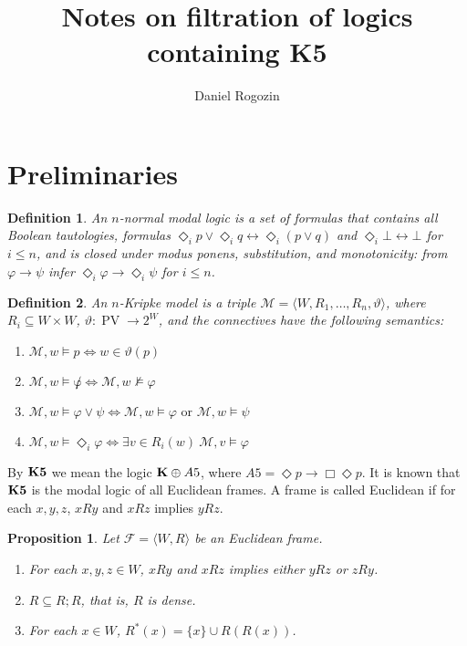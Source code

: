 \documentclass[a4paper]{article}
\author{Daniel Rogozin}
\date{}
\title{Notes on filtration of logics containing {\bf K5}}
\theoremstyle{defin}
\newtheorem{defin}{Definition}
\theoremstyle{theorem}
\theoremstyle{prop}
\newtheorem{prop}{Proposition}
\theoremstyle{lemma}
\theoremstyle{ex}
\theoremstyle{col}
\begin{document}
\maketitle

\nocite{*}

\section{Preliminaries}

\begin{defin}
  An $n$-normal modal logic is a set of formulas that contains all Boolean tautologies, formulas $\Diamond_i p \lor \Diamond_i q \leftrightarrow \Diamond_i (p \lor q)$ and $\Diamond_i \bot \leftrightarrow \bot$ for $i \leq n$, and is closed under modus ponens, substitution, and monotonicity: from $\varphi \rightarrow \psi$ infer $\Diamond_i \varphi \rightarrow \Diamond_i \psi$ for $i \leq n$.
\end{defin}

\begin{defin} An $n$-Kripke model is a triple $\mathcal{M} = \langle W, R_1, \dots, R_n, \vartheta \rangle$, where $R_i \subseteq W \times W$, $\vartheta : \operatorname{PV} \to 2^W$, and the connectives have the following semantics:

  \begin{enumerate}
    \item $\mathcal{M}, w \models p \Leftrightarrow w \in \vartheta(p)$
    \item $\mathcal{M}, w \models \not \varphi \Leftrightarrow \mathcal{M}, w \nvDash \varphi$
    \item $\mathcal{M}, w \models \varphi \lor \psi \Leftrightarrow \mathcal{M}, w \models \varphi \text{ or } \mathcal{M}, w \models \psi$
    \item $\mathcal{M}, w \models \Diamond_i \varphi \Leftrightarrow \exists v \in R_i(w) \: \mathcal{M}, v \models \varphi$
  \end{enumerate}
\end{defin}

By ${\bf K5}$ we mean the logic ${\bf K} \oplus {A5}$, where ${A5} = \Diamond p \to \Box \Diamond p$. It is known that ${\bf K5}$ is the modal logic of all Euclidean frames. A frame is called Euclidean if for each $x, y, z$, $x R y$ and $x R z$ implies $y R z$.

\begin{prop}
  Let $\mathcal{F} = \langle W, R \rangle$ be an Euclidean frame.

  \begin{enumerate}
    \item For each $x, y, z \in W$, $x R y$ and $x R z$ implies either $y R z$ or $z R y$.
    \item $R \subseteq R ; R$, that is, $R$ is dense.
    \item For each $x \in W$, $R^{*}(x) = \{ x\} \cup R(R(x))$.
  \end{enumerate}
\end{prop}
\end{document}
